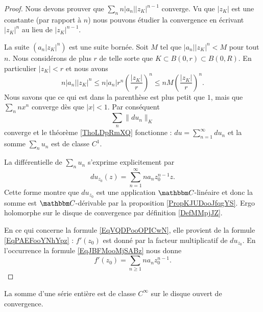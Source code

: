 \begin{proof}
    Nous devons prouver que \( \sum_nn| a_n | |z_K |^{n-1}\) converge. Vu que \( | z_K |\) est une constante (par rapport à \( n\)) nous pouvons étudier la convergence en écrivant \( | z_K |^n\) au lieu de \( | z_K |^{n-1}\).

    La suite \( (a_n| z_K |^n)\) est une suite bornée. Soit \( M\) tel que \( | a_n | |z_K |^n<M\) pour tout \( n\). Nous considérons de plus \( r\) de telle sorte que \( K\subset B(0,r)\subset B(0,R)\). En particulier \( | z_K |<r\) et nous avons
    \begin{equation}
        n| a_n | |z_K |^n\leq n| a_n |r^n\left( \frac{ | z_K | }{ r } \right)^n\leq nM\left( \frac{ | z_K | }{ r } \right)^n.
    \end{equation}
    Nous savons que ce qui est dans la parenthèse est plus petit que \( 1\), mais que \( \sum_nnx^n\) converge dès que \( | x |<1\). Par conséquent
    \begin{equation}
        \sum_n\| du_n \|_K
    \end{equation}
    converge et le théorème \ref{ThoLDpRmXQ} fonctionne : \( du=\sum_{n=1}^{\infty}du_n\) et la somme \( \sum_nu_n\) est de classe \( C^1\).

    La différentielle de \( \sum_nu_n\) s'exprime explicitement par
    \begin{equation}        \label{EqJBFMooMjSABz}
        du_{z_0}(z)=\sum_{n=1}^{\infty}na_nz_0^{n-1}z.
    \end{equation}
    Cette forme montre que \( du_{z_0}\) est une application \( \eC\)-linéaire et donc la somme est \( \eC\)-dérivable par la proposition \ref{PropKJUDooJfqgYS}. Ergo holomorphe sur le disque de convergence par définition \ref{DefMMpjJZ}.

    En ce qui concerne la formule \eqref{EqVQDPooOPICwN}, elle provient de la formule \eqref{EqPAEFooYNhYpz} : \( f'(z_0)\) est donné par la facteur multiplicatif de \( du_{z_0}\). En l'occurrence la formule \eqref{EqJBFMooMjSABz} nous donne
    \begin{equation}
        f'(z_0)=\sum_{n\geq 1}na_nz_0^{n-1}.
    \end{equation}
\end{proof}

\begin{corollary}       \label{CorCBYHooQhgara}
    La somme d'une série entière est de classe \( C^{\infty}\) sur le disque ouvert de convergence.
\end{corollary}

